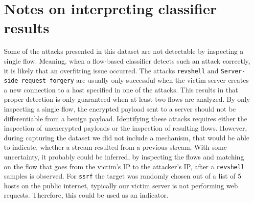 \section{Notes on interpreting classifier results}
\label{sec:notes}
Some of the attacks presented in this dataset are not detectable by inspecting a single flow. Meaning, when a flow-based classifier detects such an attack correctly, it is likely that an overfitting issue occurred. The attacks \texttt{revshell} and \texttt{Server-side request forgery} are usually only successful when the victim server creates a new connection to a host specified in one of the attacks. This results in that proper detection is only guaranteed when at least two flows are analyzed. By only inspecting a single flow, the encrypted payload sent to a server should not be differentiable from a benign payload. Identifying these attacks requires either the inspection of unencrypted payloads or the inspection of resulting flows. However, during capturing the dataset we did not include a mechanism, that would be able to indicate, whether a stream resulted from a previous stream. With some uncertainty, it probably could be inferred, by inspecting the flows and matching on the flow that goes from the victim's IP to the attacker's IP, after a \texttt{revshell} samples is observed. For \texttt{ssrf} the target was randomly chosen out of a list of 5 hosts on the public internet, typically our victim server is not performing web requests. Therefore, this could be used as an indicator.